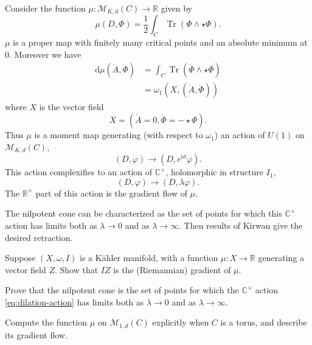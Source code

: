 \documentclass[12pt,letterpaper,reqno]{article}
\numberwithin{equation}{section}
\newcommand{\cM}{\ensuremath{\mathcal M}}
\newcommand{\R}{\ensuremath{\mathbb R}}
\newcommand{\C}{\ensuremath{\mathbb C}}
\newcommand{\half}{\ensuremath{\frac{1}{2}}}
\newcommand{\kahler}{K\"ahler\xspace}
\newcommand{\I}{{\mathrm i}}
\newcommand{\de}{\mathrm{d}}
\DeclareMathOperator{\Tr}{Tr}
\newcommand{\fixme}[1]{{\color{orange}{[#1]}}}
\begin{document}
\begin{pf} \fixme{Hausel thesis} Consider the function $\mu: \cM_{K,d}(C) \to \R$ given by
\begin{equation} \label{eq:morse-function}
  \mu(D,\Phi) = \half \int_C \Tr (\Phi \wedge \star \Phi).
\end{equation}
$\mu$ is a proper 
map \fixme{why?} with finitely many critical points
and an absolute minimum at $0$.
Moreover we have
\begin{align}
  \de \mu(\dot A, \dot \Phi) &= \int_C \Tr (\dot\Phi \wedge \star \Phi) \\
  &= \omega_1(X,(\dot A, \dot \Phi))
\end{align}
where $X$ is the vector field
\begin{equation}
  X = (\dot A = 0, \dot \Phi = -\star \Phi).
\end{equation}
Thus $\mu$ is a moment map generating (with respect to $\omega_1$) 
an action of $U(1)$ on $\cM_{K,d}(C)$,
\begin{equation}
  (D,\varphi) \to (D,e^{\I \vartheta} \varphi).
\end{equation}
This action complexifies to an action of $\C^\times$, holomorphic 
in structure $I_1$,
\begin{equation} \label{eq:dilation-action}
  (D,\varphi) \to (D,\lambda \varphi).
\end{equation}
The $\R^\times$ part of this action is the gradient flow of $\mu$.

The nilpotent cone can be characterized as the set of points
for which this $\C^\times$ action has limits both as $\lambda \to 0$
and as $\lambda \to \infty$.
Then results of Kirwan \fixme{...} give the desired retraction.

\end{pf}

\begin{exercise} Suppose $(X,\omega,I)$ 
is a \kahler manifold, with a function $\mu: X \to \R$
generating a vector field $Z$. Show that $IZ$ is the (Riemannian) gradient
of $\mu$.
\end{exercise}

\begin{exercise} Prove that the nilpotent cone is the set of points
for which the $\C^\times$ action \eqref{eq:dilation-action} has 
limits both as $\lambda \to 0$
and as $\lambda \to \infty$.
\end{exercise}

\begin{exercise} Compute the function $\mu$ on $\cM_{1,d}(C)$
explicitly when $C$ is a torus, and describe its gradient flow.
\end{exercise}
\end{document}
